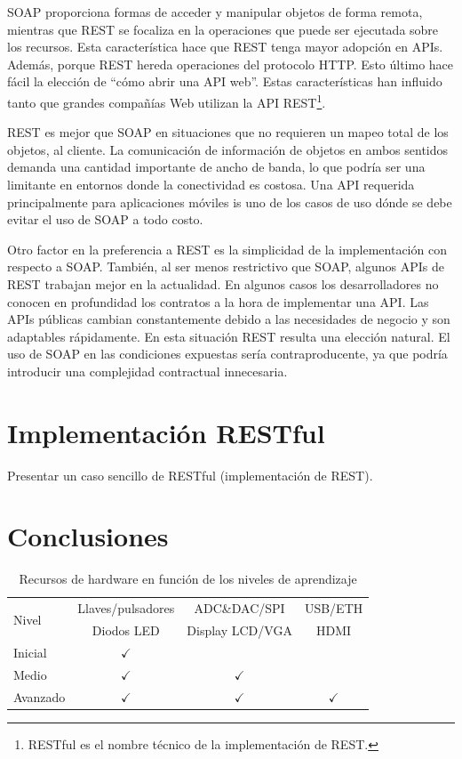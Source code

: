 \documentclass[conference]{IEEEtran}
\begin{document}
SOAP proporciona formas de acceder y manipular objetos de forma
remota, mientras que REST se focaliza en la operaciones que puede ser
ejecutada sobre los recursos. Esta característica hace que REST tenga
mayor adopción en APIs. Además, porque REST hereda operaciones del
protocolo HTTP. Esto último hace fácil la elección de ``cómo abrir una
API web''. Estas características han influido tanto que grandes
compañías Web utilizan la API REST\footnote{RESTful es el nombre
  técnico de la implementación de REST.}.

REST es mejor que SOAP en situaciones que no requieren un mapeo total
de los objetos, al cliente. La comunicación de información de objetos
en ambos sentidos demanda una cantidad importante de ancho de banda,
lo que podría ser una limitante en entornos donde la conectividad es
costosa. Una API requerida principalmente para aplicaciones móviles is
uno de los casos de uso dónde se debe evitar el uso de SOAP a todo
costo. 

Otro factor en la preferencia a REST es la simplicidad de la
implementación con respecto a SOAP. También, al ser menos restrictivo
que SOAP, algunos APIs de REST trabajan mejor en la actualidad. En
algunos casos los desarrolladores no conocen en profundidad los
contratos a la hora de implementar una API. Las APIs públicas cambian
constantemente debido a las necesidades de negocio y son adaptables
rápidamente. En esta situación REST resulta una elección
natural. El uso de SOAP en las condiciones expuestas sería
contraproducente, ya que podría introducir una complejidad contractual
innecesaria. 

\section{Implementación RESTful}
\label{sec:imp-rest}

Presentar un caso sencillo de RESTful (implementación de REST).

\lipsum[3]


\section{Conclusiones}
\label{sec:con}


\begin{table}[!t]
\renewcommand{\arraystretch}{1.3}
\caption{Recursos de hardware en función de los niveles de aprendizaje}
\label{tab:rec-plataforma}
\centering
\begin{tabular}{|l|c|c|c|}
\hline
\multirow{2}{*}{Nivel} & Llaves/pulsadores & ADC\&DAC/SPI & USB/ETH \\
                       & Diodos LED & Display LCD/VGA & HDMI \\
\hline
Inicial & $\checkmark$ & & \\
\hline
Medio & $\checkmark$ & $\checkmark$ & \\
\hline
Avanzado & $\checkmark$ & $\checkmark$ & $\checkmark$ \\
\hline
\end{tabular}
\end{table}
\end{document}
